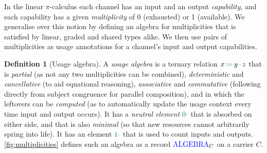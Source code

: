 \documentclass[sigplan,10pt,anonymous,review]{acmart}
\theoremstyle{definition}
\newtheorem{nidefinition}{Definition}
\newcommand{\picalc}{$\pi$-calculus}
\newcommand{\type}[1]{\textcolor{blue}{\operatorname{#1}}}
\newcommand{\func}[1]{\textcolor{teal}{\operatorname{#1}}}
\newcommand{\op}[3]{#1 \, \func{\coloneqq} \, #2 \, \func{\cdot} \, #3}
\newcommand{\zero}{\func{0\cdot}}
\newcommand{\one}{\func{1\cdot}}
\newcommand{\Algebra}{\type{ALGEBRA}}
\begin{document}
In the linear \picalc{} each channel has an input and an output \emph{capability}, and each capability has a given \emph{multiplicity} of 0 (exhausted) or 1 (available).
We generalise over this notion by defining an algebra for multiplicities that is satisfied by linear, graded and shared types alike.
We then use pairs of multiplicities as usage annotations for a channel's input and output capabilities.

\begin{nidefinition}[Usage algebra]
  A \emph{usage algebra} is a ternary relation $\op{x}{y}{z}$ that is \emph{partial} (as not any two multiplicities can be combined), \emph{deterministic} and \emph{cancellative} (to aid equational reasoning), \emph{associative} and \emph{commutative} (following directly from subject congruence for parallel composition), and in which the leftovers can be \emph{computed} (as to automatically update the usage context every time input and output occurs).
  It has a \emph{neutral element} $\zero$ that is absorbed on either side, and that is also \emph{minimal} (so that new resources cannot arbitrarily spring into life).
  It has an element $\one$ that is used to count inputs and outputs.
  \autoref{fig:multiplicities} defines such an algebra as a record $\Algebra_C$ on a carrier $C$.


\end{nidefinition}
\end{document}
